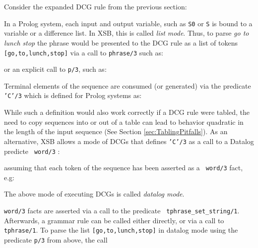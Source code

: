 
Consider the expanded DCG rule from the previous section:


In a Prolog system, each input and output variable, such as {\tt S0}
or {\tt S} is bound to a variable or a difference list.  In XSB, this
is called {\em list mode}.  Thus, to parse {\em go to lunch stop} the
phrase would be presented to the DCG rule as a list of tokens {\tt
[go,to,lunch,stop]} via a call to {\tt phrase/3} such as:


\noindent
or an explicit call to {\tt p/3}, such as:


\noindent
Terminal elements of the sequence are consumed (or generated) via the
predicate {\tt 'C'/3} which is defined for Prolog systems as:


While such a definition would also work correctly if a DCG rule were
tabled, the need to copy sequences into or out of a table can lead to
behavior quadratic in the length of the input sequence (See Section
\ref{sec:TablingPitfalls}).  As an alternative, XSB allows a mode of
DCGs that defines {\tt 'C'/3} as a call to a Datalog predicte {\tt
word/3} :


\noindent
assuming that each token of the sequence has been asserted as a {\tt
word/3} fact, e.g:


\noindent
The above mode of executing DCGs is called {\em datalog mode}.  

{\tt word/3} facts are asserted via a call to the predicate {\tt
tphrase\_set\_string/1}.  Afterwards, a grammar rule can be called
either directly, or via a call to {\tt tphrase/1}.  To parse the list
{\tt [go,to,lunch,stop]} in datalog mode using the predicate {\tt p/3}
from above, the call

